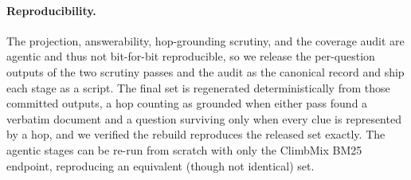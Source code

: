 \paragraph{Reproducibility.}
The projection, answerability, hop-grounding scrutiny, and the coverage audit are agentic and thus not
bit-for-bit reproducible, so we release the per-question outputs of the two scrutiny passes and the audit as
the canonical record and ship each stage as a script. The final set is regenerated deterministically from
those committed outputs, a hop counting as grounded when either pass found a verbatim document and a question
surviving only when every clue is represented by a hop, and we verified the rebuild reproduces the released set
exactly. The agentic stages can be re-run from scratch with only the ClimbMix BM25 endpoint, reproducing an
equivalent (though not identical) set.
